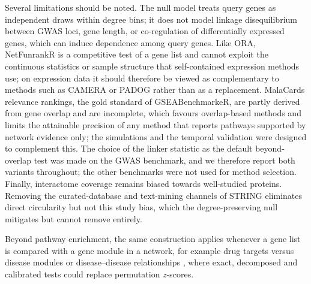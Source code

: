 Several limitations should be noted. The null model treats query genes as independent draws within degree bins; it does not model linkage disequilibrium between GWAS loci, gene length, or co-regulation of differentially expressed genes, which can induce dependence among query genes. Like ORA, NetFunrankR is a competitive test of a gene list and cannot exploit the continuous statistics or sample structure that self-contained expression methods use; on expression data it should therefore be viewed as complementary to methods such as CAMERA or PADOG rather than as a replacement. MalaCards relevance rankings, the gold standard of GSEABenchmarkeR, are partly derived from gene overlap and are incomplete, which favours overlap-based methods and limits the attainable precision of any method that reports pathways supported by network evidence only; the simulations and the temporal validation were designed to complement this. The choice of the linker statistic as the default beyond-overlap test was made on the GWAS benchmark, and we therefore report both variants throughout; the other benchmarks were not used for method selection. Finally, interactome coverage remains biased towards well-studied proteins. Removing the curated-database and text-mining channels of STRING eliminates direct circularity but not this study bias, which the degree-preserving null mitigates but cannot remove entirely.

Beyond pathway enrichment, the same construction applies whenever a gene list is compared with a gene module in a network, for example drug targets versus disease modules \citep{Guney2016} or disease--disease relationships \citep{Menche2015}, where exact, decomposed and calibrated tests could replace permutation $z$-scores.
